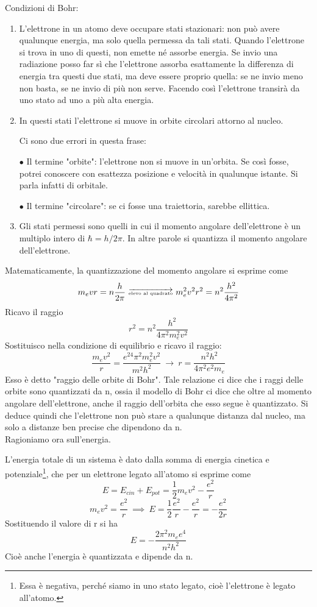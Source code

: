 Condizioni di Bohr:
\begin{enumerate}
  \item L'elettrone in un atomo deve occupare stati stazionari: non può avere qualunque energia, ma solo quella permessa da tali stati. Quando l'elettrone si trova in uno di questi, non emette né assorbe energia. Se invio una radiazione posso far sì che l'elettrone assorba esattamente la differenza di energia tra questi due stati, ma deve essere proprio quella: se ne invio meno non basta, se ne invio di più non serve.
  Facendo così l'elettrone transirà da uno stato ad uno a più alta energia.
  \item In questi stati l'elettrone si muove in orbite circolari attorno al nucleo.
  
  Ci sono due errori in questa frase:

  $\bullet$ Il termine "orbite": l'elettrone non si muove in un'orbita. Se così fosse, potrei conoscere con esattezza posizione e velocità in qualunque istante. Si parla infatti di orbitale.

  $\bullet$ Il termine "circolare": se ci fosse una traiettoria, sarebbe ellittica.
  \item Gli stati permessi sono quelli in cui il momento angolare dell'elettrone è un multiplo intero di $\hbar=h/2\pi$. In altre parole si quantizza il momento angolare dell'elettrone. 
\end{enumerate}
Matematicamente, la quantizzazione del momento angolare si esprime come
$$m_evr=n\frac{h}{2\pi}\ \overrightarrow{\text{\tiny{elevo al quadrato}}}\ m_e^2v^2r^2=n^2\frac{h^2}{4\pi^2}$$
Ricavo il raggio
$$r^2=n^2\frac{h^2}{4\pi^2m_e^2v^2}$$
Sostituisco nella condizione di equilibrio e ricavo il raggio:
$$\frac{m_ev^2}{r}=\frac{e^24\pi^2m_e^2v^2}{m^2h^2}\ \rightarrow\ r=\frac{n^2h^2}{4\pi^2e^2m_e}$$
Esso è detto "raggio delle orbite di Bohr".
Tale relazione ci dice che i raggi delle orbite sono quantizzati da n, ossia il modello di Bohr ci dice che oltre al momento angolare dell'elettrone, anche il raggio dell'orbita che esso segue è quantizzato. Si deduce quindi che l'elettrone non può stare a qualunque distanza dal nucleo, ma solo a distanze ben precise che dipendono da n.\\
Ragioniamo ora sull'energia.

L'energia totale di un sistema è dato dalla somma di energia cinetica e potenziale\footnote{Essa è negativa, perché siamo in uno stato legato, cioè l'elettrone è legato all'atomo.}, che per un elettrone legato all'atomo si esprime come
$$E=E_{cin} + E_{pot}=\frac{1}{2}m_ev^2 - \frac{e^2}{r}$$
$$m_ev^2=\frac{e^2}{r}\ \implies\ E=\frac{1}{2}\frac{e^2}{r} - \frac{e^2}{r}=- \frac{e^2}{2r}$$
Sostituendo il valore di r si ha
$$E=-\frac{2\pi^2m_ee^4}{n^2h^2}$$
Cioè anche l'energia è quantizzata e dipende da n.

